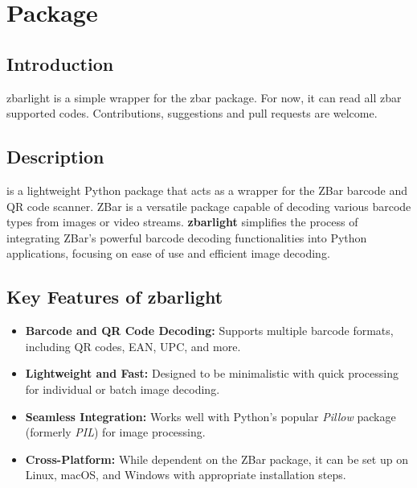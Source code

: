%
%
%
%



\chapter{Package }

\section{Introduction}

zbarlight is a simple wrapper for the zbar package. For now, it can read all zbar supported codes. Contributions, suggestions and pull requests are welcome.\cite{zbarlightpypi:2024}

\section{Description}

 is a lightweight Python package that acts as a wrapper for the ZBar barcode and QR code scanner. ZBar is a versatile package capable of decoding various barcode types from images or video streams. \textbf{zbarlight} simplifies the process of integrating ZBar’s powerful barcode decoding functionalities into Python applications, focusing on ease of use and efficient image decoding. \cite{zbarlightpypi:2024}

\section {Key Features of zbarlight}

\begin{itemize}
	\item \textbf{Barcode and QR Code Decoding:} Supports multiple barcode formats, including QR codes, EAN, UPC, and more.
	\item \textbf{Lightweight and Fast:} Designed to be minimalistic with quick processing for individual or batch image decoding.
	\item \textbf{Seamless Integration:} Works well with Python’s popular \textit{Pillow} package (formerly \textit{PIL}) for image processing.
	\item \textbf{Cross-Platform:} While dependent on the ZBar package, it can be set up on Linux, macOS, and Windows with appropriate installation steps.
\end{itemize}


